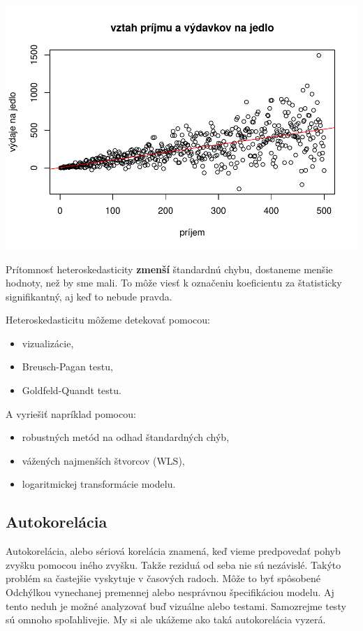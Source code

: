 \includegraphics{test_files/figure-latex/unnamed-chunk-51-1.pdf}

Prítomnosť heteroskedasticity \textbf{zmenší} štandardnú chybu,
dostaneme menšie hodnoty, než by sme mali. To môže viesť k označeniu
koeficientu za štatisticky signifikantný, aj keď to nebude pravda.

Heteroskedasticitu môžeme detekovať pomocou:

\begin{itemize}
\tightlist
\item
  vizualizácie,
\item
  Breusch-Pagan testu,
\item
  Goldfeld-Quandt testu.
\end{itemize}

A vyriešiť napríklad pomocou:

\begin{itemize}
\tightlist
\item
  robustných metód na odhad štandardných chýb,
\item
  vážených najmenších štvorcov (WLS),
\item
  logaritmickej transformácie modelu.
\end{itemize}

\hypertarget{autokoreluxe1cia}{%
\subsection{Autokorelácia}\label{autokoreluxe1cia}}

Autokorelácia, alebo sériová korelácia znamená, keď vieme predpovedať
pohyb zvyšku pomocou iného zvyšku. Takže reziduá od seba nie sú
nezávislé. Takýto problém sa častejšie vyskytuje v časových radoch. Môže
to byť spôsobené Odchýlkou vynechanej premennej alebo nesprávnou
špecifikáciou modelu. Aj tento neduh je možné analyzovať buď vizuálne
alebo testami. Samozrejme testy sú omnoho spoľahlivejie. My si ale
ukážeme ako taká autokorelácia vyzerá.

